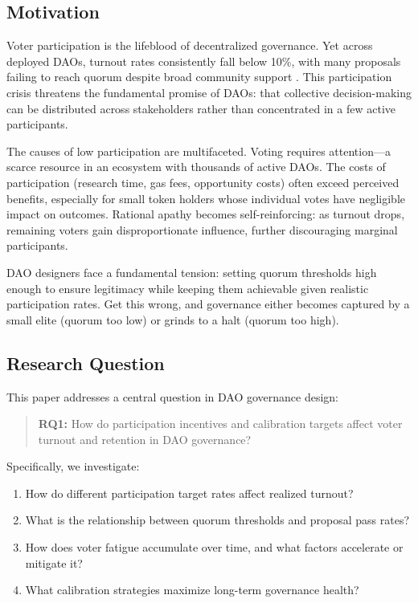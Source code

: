 
\subsection{Motivation}

Voter participation is the lifeblood of decentralized governance. Yet across deployed DAOs, turnout rates consistently fall below 10\%, with many proposals failing to reach quorum despite broad community support \citep{deepdao2023analytics, snapshot2021governance}. This participation crisis threatens the fundamental promise of DAOs: that collective decision-making can be distributed across stakeholders rather than concentrated in a few active participants.

The causes of low participation are multifaceted. Voting requires attention---a scarce resource in an ecosystem with thousands of active DAOs. The costs of participation (research time, gas fees, opportunity costs) often exceed perceived benefits, especially for small token holders whose individual votes have negligible impact on outcomes. Rational apathy becomes self-reinforcing: as turnout drops, remaining voters gain disproportionate influence, further discouraging marginal participants.

DAO designers face a fundamental tension: setting quorum thresholds high enough to ensure legitimacy while keeping them achievable given realistic participation rates. Get this wrong, and governance either becomes captured by a small elite (quorum too low) or grinds to a halt (quorum too high).

\subsection{Research Question}

This paper addresses a central question in DAO governance design:

\begin{quote}
\textbf{RQ1:} How do participation incentives and calibration targets affect voter turnout and retention in DAO governance?
\end{quote}

Specifically, we investigate:
\begin{enumerate}
    \item How do different participation target rates affect realized turnout?
    \item What is the relationship between quorum thresholds and proposal pass rates?
    \item How does voter fatigue accumulate over time, and what factors accelerate or mitigate it?
    \item What calibration strategies maximize long-term governance health?
\end{enumerate}

